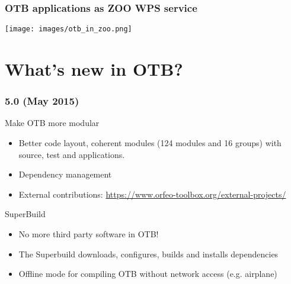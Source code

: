 \documentclass[8pt]{beamer}
\begin{document}
\begin{frame}
  \frametitle{OTB applications as ZOO WPS service}
\begin{minipage}[t][6cm][t]{\textwidth}
\begin{center}
\texttt{[image: images/otb\_in\_zoo.png]}
\end{center}
\end{minipage}
\end{frame}

\section{What's new in OTB?}

\begin{frame}
\frametitle{5.0 (May 2015)}
\begin{block}{Make OTB more modular}
\begin{itemize}
  \item Better code layout, coherent modules (124 modules and 16 groups) with
    source, test and applications.
\item Dependency management
\item External contributions: \url{https://www.orfeo-toolbox.org/external-projects/}
\end{itemize}
\end{block}

\begin{block}{SuperBuild}
\begin{itemize}
\item No more third party software in OTB!
\item The Superbuild downloads, configures, builds and installs dependencies
\item Offline mode for compiling OTB without network access (e.g. airplane)
\end{itemize}
\end{block}
\end{frame}
\end{document}
